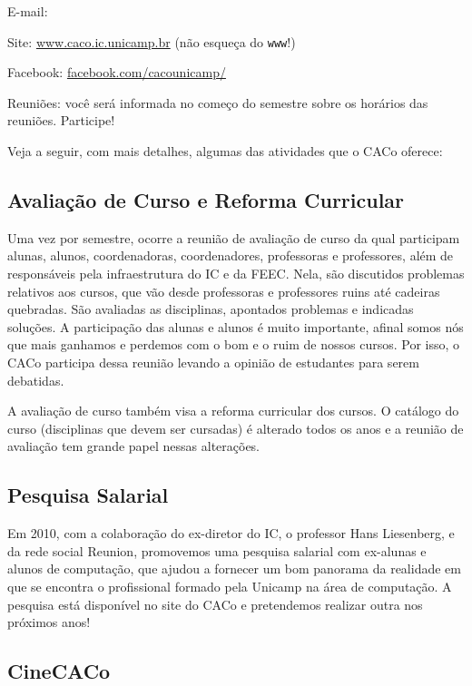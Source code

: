 \begin{compactitemize}
    \item  E-mail: 
    \item  Site: \url{www.caco.ic.unicamp.br} (não esqueça do \texttt{www}!)
    \item  Facebook: \url{facebook.com/cacounicamp/}
    \item  Reuniões: você será informada no começo do semestre sobre os
    horários das reuniões. Participe!
\end{compactitemize}

Veja a seguir, com mais detalhes, algumas das atividades que o CACo oferece:

\subsection{Avaliação de Curso e Reforma Curricular}

Uma vez por semestre, ocorre a reunião de avaliação de curso da qual participam
alunas, alunos, coordenadoras, coordenadores, professoras e professores, além
de responsáveis pela infraestrutura do IC e da FEEC. Nela, são discutidos
problemas relativos aos cursos, que vão desde professoras e professores ruins
até cadeiras quebradas. São avaliadas as disciplinas, apontados problemas e
indicadas soluções. A participação das alunas e alunos é muito importante,
afinal somos nós que mais ganhamos e perdemos com o bom e o ruim de nossos
cursos. Por isso, o CACo participa dessa reunião levando a opinião de
estudantes para serem debatidas.

A avaliação de curso também visa a reforma curricular dos cursos. O catálogo do
curso (disciplinas que devem ser cursadas) é alterado todos os anos e a reunião
de avaliação tem grande papel nessas alterações.

\subsection{Pesquisa Salarial}

Em 2010, com a colaboração do ex-diretor do IC, o professor Hans Liesenberg, e
da rede social Reunion, promovemos uma pesquisa salarial com ex-alunas e alunos
de computação, que ajudou a fornecer um bom panorama da realidade em que se
encontra o profissional formado pela Unicamp na área de computação. A pesquisa
está disponível no site do CACo e pretendemos realizar outra nos próximos anos!

\subsection{CineCACo}

